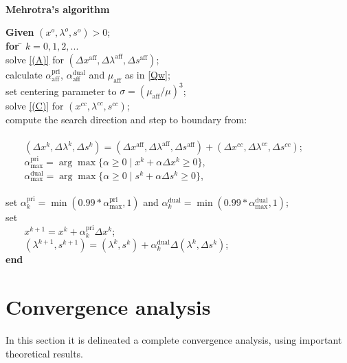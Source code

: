 \documentclass[a4paper,10 pt,titlepage,twoside]{book}
\theoremstyle{plain}
\theoremstyle{definition}
\theoremstyle{remark}
\begin{document}
\newpage
\\
\textbf{Mehrotra's algorithm}
\begin{tabbing}
	\textbf{Given} $(x^{o}, \lambda^{o}, s^{o})> 0$; \\
	\textbf{for} \= $k = 0, 1, 2,...$ \\
	\> solve \ref{(A)} for $(\Delta x^{\text{aff}},\Delta \lambda^{\text{aff}},\Delta s^{\text{aff}})$;\\
	\> calculate $\alpha_{\text{aff}}^{\text{pri}}$, $\alpha_{\text{aff}}^{\text{dual}}$ and $\mu_{\text{aff}}$ as in \ref{Qw};\\
	\> set centering parameter to $\sigma = (\mu_{\text{aff}}/\mu)^{3}$; \\
	\> solve \ref{(C)} for $(x^{cc},\lambda^{cc},s^{cc})$;\\
	\> compute the search direction and step to boundary from: \\
	\< \\
	\> $\;\;\;\;\;\;\;(\Delta x^{k},\Delta \lambda^{k},\Delta s^{k})=(\Delta x^{\text{aff}},\Delta \lambda^{\text{aff}},\Delta s^{\text{aff}})+(\Delta x^{cc},\Delta  \lambda^{cc},\Delta s^{cc})$;\\
	\> $\;\;\;\;\;\;\;\alpha_{\text{max}}^{\text{pri}}=\arg\max\{\alpha\geq0\;|\;x^{k} +\alpha\Delta x^{k}\geq 0\}$,\\
	\> $\;\;\;\;\;\;\;\alpha_{\text{max}}^{\text{dual}}=\arg\max\{\alpha\geq0\;|\;s^{k} +\alpha\Delta s^{k}\geq 0\}$,\\
	\>\\
	\> set $\alpha_{k}^{\text{pri}}=\min(0.99\ast\alpha_{\text{max}}^{\text{pri}},1)$ and $\alpha_{k}^{\text{dual}}=\min(0.99\ast\alpha_{\text{max}}^{\text{dual}},1)$;\\
	\> set\\
	\> $\;\;\;\;\;\;\;x^{k+1} = x^{k} + \alpha_{k}^{\text{pri}}\Delta x^{k}$;\\
	\>$\;\;\;\;\;\;\;(\lambda^{k+1},s^{k+1}) = (\lambda^{k},s^{k}) + \alpha_{k}^{\text{dual}}\Delta (\lambda^{k},\Delta s^{k})$;\\
\textbf{end}
\end{tabbing}



 
%
\chapter{Convergence analysis}
In this section it is delineated a complete convergence analysis, using important theoretical results. 
\end{document}
